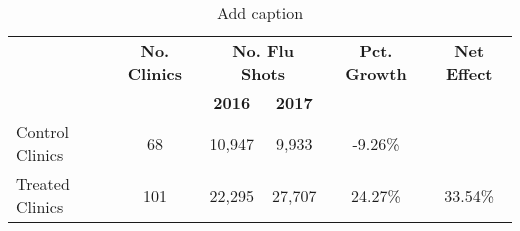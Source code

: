 \begin{table}[htbp]
  \centering
  \caption{Add caption}
    \begin{tabular}{lccccc}
          & \textbf{No. Clinics} & \multicolumn{2}{c}{\textbf{No. Flu Shots}} & \textbf{Pct. Growth} & \textbf{Net Effect} \\
          &       & \textbf{2016} & \textbf{2017} &       &  \\
    Control Clinics & 68    & 10,947 & 9,933 & -9.26\% &  \\
    Treated Clinics & 101   & 22,295 & 27,707 & 24.27\% & 33.54\% \\
    \end{tabular}%
  \label{tab:addlabel}%
\end{table}%
